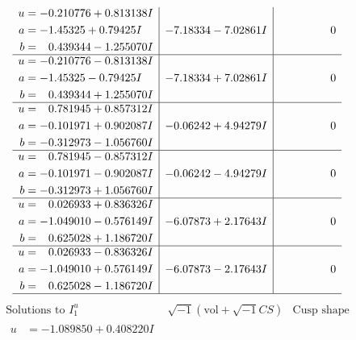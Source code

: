 \documentclass[1p]{elsarticle_modified}
\theoremstyle{definition}
\newcommand{\I}{\sqrt{-1}}
\begin{document}
$$\begin{array}{c|c|c}
\begin{aligned}
u &= -0.210776 + 0.813138 I \\
a &= -1.45325 + 0.79425 I \\
b &= \phantom{-}0.439344 - 1.255070 I\end{aligned}
 & -7.18334 - 7.02861 I & \phantom{-0.000000 } 0 \\ \hline\begin{aligned}
u &= -0.210776 - 0.813138 I \\
a &= -1.45325 - 0.79425 I \\
b &= \phantom{-}0.439344 + 1.255070 I\end{aligned}
 & -7.18334 + 7.02861 I & \phantom{-0.000000 } 0 \\ \hline\begin{aligned}
u &= \phantom{-}0.781945 + 0.857312 I \\
a &= -0.101971 + 0.902087 I \\
b &= -0.312973 - 1.056760 I\end{aligned}
 & -0.06242 + 4.94279 I & \phantom{-0.000000 } 0 \\ \hline\begin{aligned}
u &= \phantom{-}0.781945 - 0.857312 I \\
a &= -0.101971 - 0.902087 I \\
b &= -0.312973 + 1.056760 I\end{aligned}
 & -0.06242 - 4.94279 I & \phantom{-0.000000 } 0 \\ \hline\begin{aligned}
u &= \phantom{-}0.026933 + 0.836326 I \\
a &= -1.049010 - 0.576149 I \\
b &= \phantom{-}0.625028 + 1.186720 I\end{aligned}
 & -6.07873 + 2.17643 I & \phantom{-0.000000 } 0 \\ \hline\begin{aligned}
u &= \phantom{-}0.026933 - 0.836326 I \\
a &= -1.049010 + 0.576149 I \\
b &= \phantom{-}0.625028 - 1.186720 I\end{aligned}
 & -6.07873 - 2.17643 I & \phantom{-0.000000 } 0\\
 \hline 
 \end{array}$$\newpage$$\begin{array}{c|c|c}  
\text{Solutions to }I^u_{1}& \I (\text{vol} + \sqrt{-1}CS) & \text{Cusp shape}\\
 \hline 
\begin{aligned}
u &= -1.089850 + 0.408220 I \\

\end{aligned}
\end{array}$$
\end{document}
